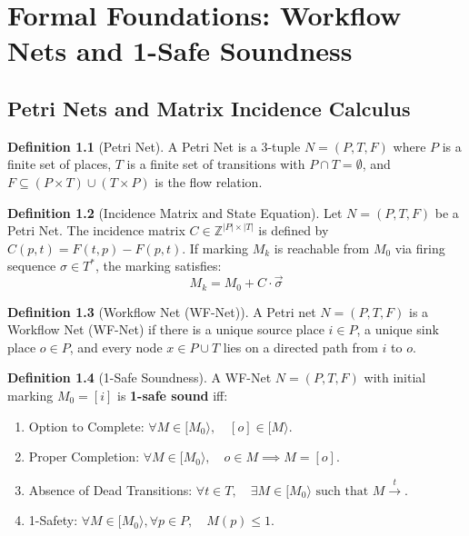 \documentclass[11pt,a4paper,oneside]{book}
\theoremstyle{definition}
\newtheorem{definition}{Definition}[chapter]
\begin{document}
\chapter{Formal Foundations: Workflow Nets and 1-Safe Soundness}

\section{Petri Nets and Matrix Incidence Calculus}

\begin{definition}[Petri Net]
A Petri Net is a 3-tuple $N = (P, T, F)$ where $P$ is a finite set of places, $T$ is a finite set of transitions with $P \cap T = \emptyset$, and $F \subseteq (P \times T) \cup (T \times P)$ is the flow relation.
\end{definition}

\begin{definition}[Incidence Matrix and State Equation]
Let $N = (P, T, F)$ be a Petri Net. The incidence matrix $C \in \mathbb{Z}^{|P| \times |T|}$ is defined by $C(p, t) = F(t, p) - F(p, t)$. If marking $M_k$ is reachable from $M_0$ via firing sequence $\sigma \in T^*$, the marking satisfies:
$$M_k = M_0 + C \cdot \vec{\sigma}$$
\end{definition}

\begin{definition}[Workflow Net (WF-Net)]
A Petri net $N = (P, T, F)$ is a Workflow Net (WF-Net) if there is a unique source place $i \in P$, a unique sink place $o \in P$, and every node $x \in P \cup T$ lies on a directed path from $i$ to $o$.
\end{definition}

\begin{definition}[1-Safe Soundness]
A WF-Net $N = (P, T, F)$ with initial marking $M_0 = [i]$ is \textbf{1-safe sound} iff:
\begin{enumerate}
    \item Option to Complete: $\forall M \in [M_0\rangle, \quad [o] \in [M\rangle$.
    \item Proper Completion: $\forall M \in [M_0\rangle, \quad o \in M \implies M = [o]$.
    \item Absence of Dead Transitions: $\forall t \in T, \quad \exists M \in [M_0\rangle \text{ such that } M \xrightarrow{t}$.
    \item 1-Safety: $\forall M \in [M_0\rangle, \forall p \in P, \quad M(p) \le 1$.
\end{enumerate}
\end{definition}
\end{document}
